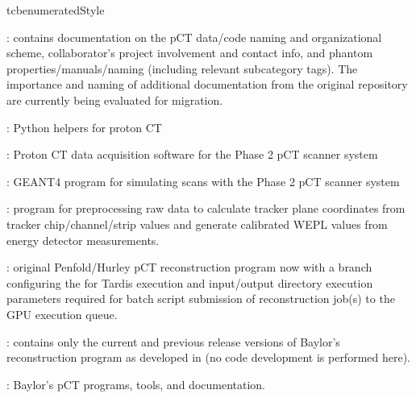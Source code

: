 \begin{tcbenvironment}
\begin{tcbparbox}{tcbenumeratedStyle}
\begin{ThinEnum}[parsep=\currentparsep]
\begin{ThinEnum}[parsep=\currentparsep]
        \item {} : contains documentation on the pCT data/code naming and organizational scheme, collaborator's project involvement and contact info, and phantom properties/manuals/naming (including relevant subcategory tags).  The importance and naming of additional documentation from the original  repository are currently being evaluated for migration.
        \item {} : Python helpers for proton CT
        \item {} : Proton CT data acquisition software for the Phase 2 pCT scanner system
        \item {} : GEANT4 program for simulating scans with the Phase 2 pCT scanner system
        \item {} : program for preprocessing raw data to calculate tracker plane coordinates from tracker chip/channel/strip values and generate calibrated WEPL values from energy detector measurements.
        \item {} : original Penfold/Hurley pCT reconstruction program now with a  branch configuring the  for Tardis execution and input/output directory execution parameters required for batch script submission of reconstruction job(s) to the GPU execution queue.
        \item {} : contains only the current and previous release versions of Baylor's reconstruction program as developed in  (no code development is performed here).
    \end{ThinEnum}
    \item {} : Baylor's pCT programs, tools, and documentation.
    \begin{ThinEnum}[parsep=\currentparsep]

\end{ThinEnum}
\end{ThinEnum}
\end{tcbparbox}
\end{tcbenvironment}
